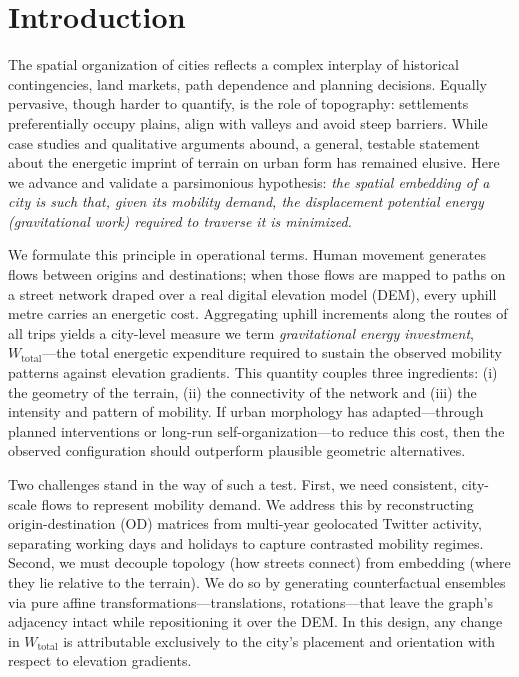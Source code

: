 \documentclass[twocolumn,amsmath,amssymb,floatfix,nature,shownopacs,footinbib,superscriptaddress]{revtex4-1} %
\begin{document}
\smallskip
\section*{Introduction}

The spatial organization of cities reflects a complex interplay of historical contingencies, land markets, path dependence and planning decisions. Equally pervasive, though harder to quantify, is the role of topography: settlements preferentially occupy plains, align with valleys and avoid steep barriers. While case studies and qualitative arguments abound, a general, testable statement about the energetic imprint of terrain on urban form has remained elusive. Here we advance and validate a parsimonious hypothesis: \emph{the spatial embedding of a city is such that, given its mobility demand, the displacement potential energy (gravitational work) required to traverse it is minimized.}

We formulate this principle in operational terms. Human movement generates flows between origins and destinations; when those flows are mapped to paths on a street network draped over a real digital elevation model (DEM), every uphill metre carries an energetic cost. Aggregating uphill increments along the routes of all trips yields a city-level measure we term \emph{gravitational energy investment}, $W_{\text{total}}$—the total energetic expenditure required to sustain the observed mobility patterns against elevation gradients. This quantity couples three ingredients: (i) the geometry of the terrain, (ii) the connectivity of the network and (iii) the intensity and pattern of mobility. If urban morphology has adapted—through planned interventions or long-run self-organization—to reduce this cost, then the observed configuration should outperform plausible geometric alternatives.

Two challenges stand in the way of such a test. First, we need consistent, city-scale flows to represent mobility demand. We address this by reconstructing origin-destination (OD) matrices from multi-year geolocated Twitter activity, separating working days and holidays to capture contrasted mobility regimes. Second, we must decouple topology (how streets connect) from embedding (where they lie relative to the terrain). We do so by generating counterfactual ensembles via pure affine transformations—translations, rotations—that leave the graph's adjacency intact while repositioning it over the DEM. In this design, any change in $W_{\text{total}}$ is attributable exclusively to the city's placement and orientation with respect to elevation gradients.
\end{document}
